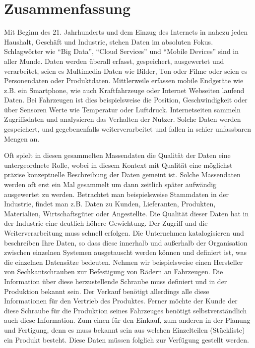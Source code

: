 \chapter*{Zusammenfassung}


Mit Beginn des 21. Jahrhunderts und dem Einzug des Internets in nahezu jeden Haushalt, Geschäft und Industrie, stehen Daten im absoluten Fokus. Schlagwörter wie \enquote{Big Data}, \enquote{Cloud Services} und \enquote{Mobile Devices} sind in aller Munde. Daten werden überall erfasst, gespeichert, ausgewertet und verarbeitet, seien es Multimedia-Daten wie Bilder, Ton oder Filme oder seien es Personendaten oder Produktdaten. Mittlerweile erfassen mobile Endgeräte wie z.B. ein Smartphone, wie auch Kraftfahrzeuge oder Internet Webseiten laufend Daten. Bei Fahrzeugen ist dies beispielsweise die Position, Geschwindigkeit oder über Sensoren Werte wie Temperatur oder Luftdruck. Internetseiten sammeln Zugriffsdaten und analysieren das Verhalten der Nutzer. Solche Daten werden gespeichert, und gegebenenfalls weiterverarbeitet und fallen in schier unfassbaren Mengen an. 

Oft spielt in diesen gesammelten Massendaten die Qualität der Daten eine untergeordnete Rolle, wobei in diesem Kontext mit Qualität eine möglichst präzise konzeptuelle Beschreibung der Daten gemeint ist. Solche Massendaten werden oft erst ein Mal gesammelt um dann zeitlich später aufwändig ausgewertet zu werden.
Betrachtet man beispielsweise Stammdaten in der Industrie, findet man z.B. Daten zu Kunden, Lieferanten, Produkten, Materialien, Wirtschaftsgüter oder Angestellte. Die Qualität dieser Daten hat in der Industrie eine deutlich höhere Gewichtung. Der Zugriff und die Weiterverarbeitung muss schnell erfolgen. Die Unternehmen katalogisieren und beschreiben Ihre Daten, so dass diese innerhalb und außerhalb der Organisation zwischen einzelnen Systemen ausgetauscht werden können und definiert ist, was die einzelnen Datensätze bedeuten. Nehmen wir beispielsweise einen Hersteller von Sechkantschrauben zur Befestigung von Rädern an Fahrzeugen. Die Information über diese herzustellende Schraube muss definiert und in der Produktion bekannt sein. Der Verkauf benötigt allerdings alle diese Informationen für den Vertrieb des Produktes. Ferner möchte der Kunde der diese Schraube für die Produktion seines Fahrzeuges benötigt selbstverständlich auch diese Information. Zum einen für den Einkauf, zum anderen in der Planung und Fertigung, denn es muss bekannt sein aus welchen Einzelteilen (Stückliste) ein Produkt besteht. Diese Daten müssen folglich zur Verfügung gestellt werden. 

